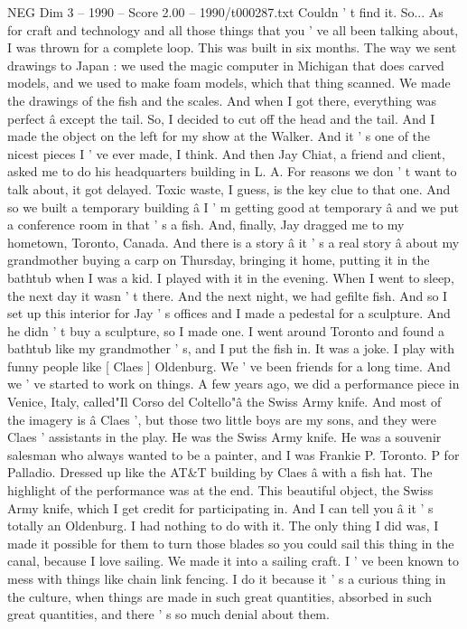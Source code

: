 \begin{textsample}{NEG Dim 3 – 1990 – Score 2.00 – 1990/t000287.txt}
Couldn ' t find it.
So...
As for craft and technology and all those things that you ' ve all been talking about, I was thrown for a complete loop.
This was built in six months.
The way we sent drawings to Japan : we used the magic computer in Michigan that does carved models, and we used to make foam models, which that thing scanned.
We made the drawings of the fish and the scales.
And when I got there, everything was perfect â except the tail.
So, I decided to cut off the head and the tail.
And I made the object on the left for my show at the Walker.
And it ' s one of the nicest pieces I ' ve ever made, I think.
And then Jay Chiat, a friend and client, asked me to do his headquarters building in L.
A.
For reasons we don ' t want to talk about, it got delayed.
Toxic waste, I guess, is the key clue to that one.
And so we built a temporary building â I ' m getting good at temporary â and we put a conference room in that ' s a fish.
And, finally, Jay dragged me to my hometown, Toronto, Canada.
And there is a story â it ' s a real story â about my grandmother buying a carp on Thursday, bringing it home, putting it in the bathtub when I was a kid.
I played with it in the evening.
When I went to sleep, the next day it wasn ' t there.
And the next night, we had gefilte fish.
And so I set up this interior for Jay ' s offices and I made a pedestal for a sculpture.
And he didn ' t buy a sculpture, so I made one.
I went around Toronto and found a bathtub like my grandmother ' s, and I put the fish in.
It was a joke.
I play with funny people like [ Claes ] Oldenburg.
We ' ve been friends for a long time.
And we ' ve started to work on things.
A few years ago, we did a performance piece in Venice, Italy, called"Il Corso del Coltello"â the Swiss Army knife.
And most of the imagery is â Claes ', but those two little boys are my sons, and they were Claes ' assistants in the play.
He was the Swiss Army knife.
He was a souvenir salesman who always wanted to be a painter, and I was Frankie P.
Toronto.
P for Palladio.
Dressed up like the AT\&T building by Claes â with a fish hat.
The highlight of the performance was at the end.
This beautiful object, the Swiss Army knife, which I get credit for participating in.
And I can tell you â it ' s totally an Oldenburg.
I had nothing to do with it.
The only thing I did was, I made it possible for them to turn those blades so you could sail this thing in the canal, because I love sailing.
We made it into a sailing craft.
I ' ve been known to mess with things like chain link fencing.
I do it because it ' s a curious thing in the culture, when things are made in such great quantities, absorbed in such great quantities, and there ' s so much denial about them.

\end{textsample}
